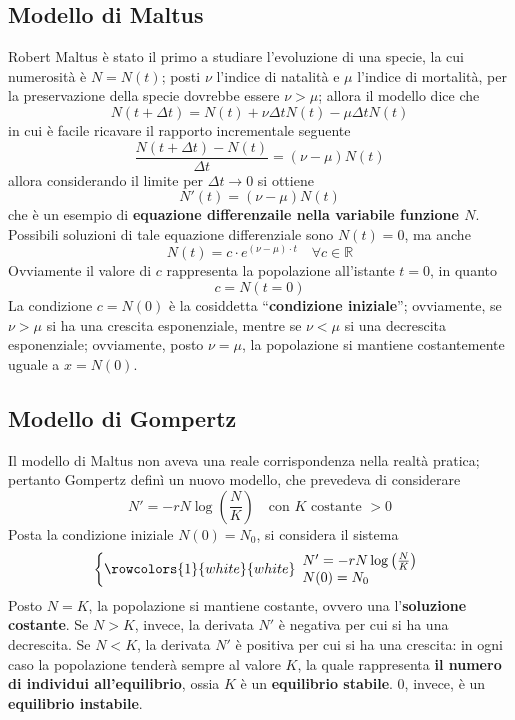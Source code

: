 \documentclass[a4paper]{extarticle}
\newcommand{\quotes}[1]{``#1''}
\begin{document}
\vspace{1em}
\subsection{Modello di Maltus}
Robert Maltus è stato il primo a studiare l'evoluzione di una specie, la cui numerosità è $N=N(t)$; posti $\nu$ l'indice di natalità e $\mu$ l'indice di mortalità, per la preservazione della specie dovrebbe essere $\nu > \mu$; allora il modello dice che
\[N(t+\Delta t) = N(t) + \nu \Delta t N (t) - \mu \Delta t N(t)\]
in cui è facile ricavare il rapporto incrementale seguente
\[\dfrac{N(t+\Delta t) - N(t)}{\Delta t} = (\nu-\mu) N(t)\]
allora considerando il limite per $\Delta t \to 0$ si ottiene
\[N'(t) = (\nu-\mu) N(t)\]
che è un esempio di \textbf{equazione differenzaile nella variabile funzione $N$}. Possibili soluzioni di tale equazione differenziale sono $N(t)=0$, ma anche
\[N(t)=c \cdot e^{(\nu-\mu) \cdot t} \hspace{1em} \forall c \in \mathbb{R}\]
Ovviamente il valore di $c$ rappresenta la popolazione all'istante $t=0$, in quanto
\[c=N(t=0)\]
La condizione $c=N(0)$ è la cosiddetta \quotes{\textbf{condizione iniziale}}; ovviamente, se $\nu>\mu$ si ha una crescita esponenziale, mentre se $\nu<\mu$ si una decrescita esponenziale; ovviamente, posto $\nu=\mu$, la popolazione si mantiene costantemente uguale a $x=N(0)$.

\vspace{1em}
\subsection{Modello di Gompertz}
Il modello di Maltus non aveva una reale corrispondenza nella realtà pratica; pertanto Gompertz definì un nuovo modello, che prevedeva di considerare
\[N' = -r N \log \left(\frac{N}{K}\right) \hspace{1em} \text{con } K \text{ costante }>0\]
Posta la condizione iniziale $N(0)=N_0$, si considera il sistema
\[
    \left\{
    \rowcolors{1}{white}{white}
    \begin{array}{l}
        N' = -r N \log \left(\frac{N}{K}\right)\\
        N(0)=N_0
    \end{array}
    \right.
\]
Posto $N=K$, la popolazione si mantiene costante, ovvero una l'\textbf{soluzione costante}. Se $N>K$, invece, la derivata $N'$ è negativa per cui si ha una decrescita. Se $N<K$, la derivata $N'$ è positiva per cui si ha una crescita: in ogni caso la popolazione tenderà sempre al valore $K$, la quale rappresenta \textbf{il numero di individui all'equilibrio}, ossia $K$ è un \textbf{equilibrio stabile}. $0$, invece, è un \textbf{equilibrio instabile}.
\end{document}
